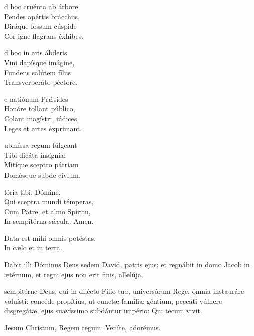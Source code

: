 \documentclass[fontsize=8pt,paper=A6,twoside,BCOR=1mm,DIV=22,headinclude]{scrarticle}
\begin{document}
\begin{multicols}{2}
{\begin{hymnus}
d hoc cruénta ab árbore\\
Pendes apértis brácchiis,\\
Diráque fossum cúspide\\
Cor igne flagrans éxhibes.

d hoc in aris ábderis\\
Vini dapísque imágine,\\
Fundens salútem fíliis\\
Transverberáto péctore.

e natiónum Prǽsides\\
Honóre tollant público,\\
Colant magístri, iúdices,\\
Leges et artes éxprimant.

ubmíssa regum fúlgeant\\
Tibi dicáta insígnia:\\
Mitíque sceptro pátriam\\
Domósque subde cívium.

lória tibi, Dómine,\\
Qui sceptra mundi témperas,\\
Cum Patre, et almo Spíritu,\\
In sempitérna sǽcula. 
Amen.
\end{hymnus}

}

{

\V Data est mihi omnis potéstas.\\
\R In cælo et in terra.

\M Dabit illi \f Dóminus Deus sedem David, patris ejus: et regnábit in domo Jacob in ætérnum, et regni ejus non erit finis, allelúja.

 sempitérne Deus, qui in dilécto Fílio tuo, universórum Rege, ómnia instauráre voluísti: concéde propítius; ut cunctæ famíliæ géntium, peccáti vúlnere disgregátæ, ejus suavíssimo subdántur império: Qui tecum vivit.



\I Jesum Christum, Regem regum: \red{*} Veníte, adorémus. \Venite

}

\vspace{-.3em}


\end{multicols}
\end{document}
